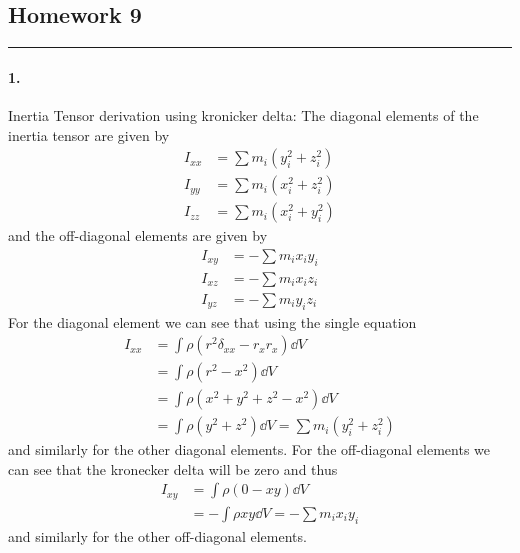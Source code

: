 \documentclass[../hw.tex]{subfiles}
\begin{document}
\setcounter{section}{9}
\begin{center}
  \section*{Homework 9} \label{sec:homework9}
\end{center}
\hrule \vspace{10px}
\paragraph*{1.} Inertia Tensor derivation using kronicker delta:
The diagonal elements of the inertia tensor are given by
\begin{align*}
    I_{xx} &= \sum m_i (y_i^2 + z_i^2) \\
    I_{yy} &= \sum m_i (x_i^2 + z_i^2) \\
    I_{zz} &= \sum m_i (x_i^2 + y_i^2)
\end{align*}
and the off-diagonal elements are given by
\begin{align*}
    I_{xy} &= -\sum m_i x_i y_i \\
    I_{xz} &= -\sum m_i x_i z_i \\
    I_{yz} &= -\sum m_i y_i z_i
\end{align*}
For the diagonal element we can see that using the single equation
\begin{align*}
    I_{xx} &= \int \rho (r^2 \delta_{xx} - r_x r_x) \dd{V} \\
    &= \int \rho (r^2 - x^2) \dd{V} \\
    &= \int \rho (x^2 + y^2 + z^2 - x^2) \dd{V} \\
    &= \int \rho (y^2 + z^2) \dd{V} = \sum m_i (y_i^2 + z_i^2)
\end{align*}
and similarly for the other diagonal elements. For the off-diagonal elements we can see that the 
kronecker delta will be zero and thus
\begin{align*}
    I_{xy} &= \int \rho (0 - x y) \dd{V} \\
    &= -\int \rho x y \dd{V} = -\sum m_i x_i y_i
\end{align*}
and similarly for the other off-diagonal elements. 
\end{document}
